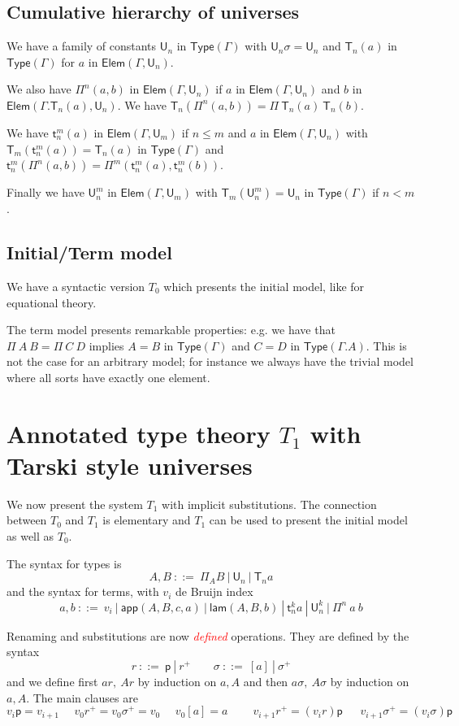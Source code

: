 \documentclass[11pt,a4paper]{article}
\theoremstyle{definition}
\def\UU{\mathsf{U}}
\newcommand{\LAM}{\mathsf{lam}}
\newcommand{\APP}{\mathsf{app}}
\newcommand{\T}{\mathsf{T}}
\newcommand{\sT}{\mathsf{t}}
\newcommand{\Elem}{\mathsf{Elem}}
\newcommand{\Type}{\mathsf{Type}}
\newcommand{\pp}{\mathsf{p}}
\newcommand{\EMP}[1]{\emph{\textcolor{red}{#1}}}
\begin{document}
\subsection{Cumulative hierarchy of universes}

We have a family of constants $\UU_n$ in $\Type(\Gamma)$ with $\UU_n\sigma = \UU_n$ and
$\T_n(a)$ in $\Type(\Gamma)$ for $a$ in $\Elem(\Gamma,\UU_n)$.

We also have $\Pi^n(a,b)$ in $\Elem(\Gamma,\UU_n)$ if $a$ in $\Elem(\Gamma,\UU_n)$ and
$b$ in $\Elem(\Gamma.\T_n(a),\UU_n)$. We have
$\T_n(\Pi^n(a,b)) = \Pi~\T_n(a)~\T_n(b)$.

We have $\sT_n^m(a)$ in $\Elem(\Gamma,\UU_m)$ if $n\leqslant m$ and $a$ in $\Elem(\Gamma,\UU_n)$
with $\T_m(\sT_n^m(a)) = \T_n(a)$ in $\Type(\Gamma)$
and $\sT_n^m(\Pi^n(a,b)) = \Pi^m(\sT_n^m(a),\sT_n^m(b))$.

Finally we have $\UU^m_n$ in $\Elem(\Gamma,\UU_m)$ with $\T_m(\UU^m_n) = \UU_n$ in $\Type(\Gamma)$ if
$n<m$.


\subsection{Initial/Term model}

We have a syntactic version $T_0$ which presents the initial model, like for equational theory.

The term model presents remarkable properties: e.g. we have that $\Pi~A~B = \Pi~C~D$ implies
$A = B$ in $\Type(\Gamma)$ and $C = D$ in $\Type(\Gamma.A)$. This is not the case for an arbitrary model; for instance
we always have the trivial model where all sorts have exactly one element.


\section{Annotated type theory $T_1$ with Tarski style universes}

We now present the system $T_1$ with implicit substitutions. The connection between $T_0$ and $T_1$ is elementary and $T_1$ can
be used to present the initial model as well as $T_0$.

The syntax for types is
$$
A,B~::=~\Pi_{A}B~|~\UU_n~|~\T_n a
$$
and the syntax for terms, with $v_i$ de Bruijn index
$$
a,b~::=~v_i~|~\APP(A,B,c,a)~|~\LAM(A,B,b)~|~\sT^k_n a~|~\UU^k_n~|~\Pi^n~a~b
$$

\medskip

Renaming and substitutions are now \EMP{defined} operations. They are defined by the syntax
$$
r~::=~\pp~|~r^+~~~~~~~~~\sigma~::=~[a]~|~\sigma^+
$$
and we define first $ar,~Ar$ by induction on $a,A$ and then $a\sigma,~A\sigma$ by induction on $a,A$. The main clauses are
$$
v_i\pp = v_{i+1}~~~~~~v_0r^+ = v_0\sigma^+ = v_0~~~~~~v_0[a] = a~~~~~~~~~~v_{i+1}r^+ = (v_ir)\pp~~~~~~~v_{i+1}\sigma^+ = (v_i\sigma)\pp
$$
\end{document}
